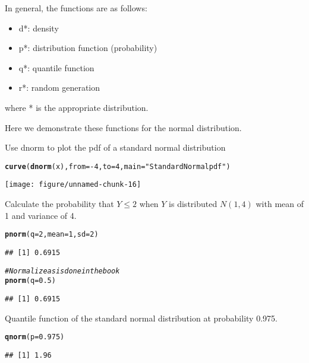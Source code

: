 \documentclass[a4paper]{article}\usepackage[]{graphicx}\usepackage[]{color}
\makeatletter
\def\maxwidth{ %
  \ifdim\Gin@nat@width>\linewidth
    \linewidth
  \else
    \Gin@nat@width
  \fi
}
\newcommand{\hlstr}[1]{\textcolor[rgb]{0.192,0.494,0.8}{#1}}%
\newcommand{\hlcom}[1]{\textcolor[rgb]{0.678,0.584,0.686}{\textit{#1}}}%
\newcommand{\hlkwd}[1]{\textcolor[rgb]{0.737,0.353,0.396}{\textbf{#1}}}%
\newenvironment{kframe}{%
 \def\at@end@of@kframe{}%
 \ifinner\ifhmode%
  \def\at@end@of@kframe{\end{minipage}}%
  \begin{minipage}{\columnwidth}%
 \fi\fi%
 \def\FrameCommand##1{\hskip\@totalleftmargin \hskip-\fboxsep
 \colorbox{shadecolor}{##1}\hskip-\fboxsep
     \hskip-\linewidth \hskip-\@totalleftmargin \hskip\columnwidth}%
 \MakeFramed {\advance\hsize-\width
   \@totalleftmargin\z@ \linewidth\hsize
   \@setminipage}}%
 {\par\unskip\endMakeFramed%
 \at@end@of@kframe}
\newenvironment{knitrout}{}{} %
\makeatother
\begin{document}
In general, the functions are as follows:
\begin{itemize}
\item d*: density
\item p*: distribution function (probability)
\item q*: quantile function
\item r*: random generation
\end{itemize}
where * is the appropriate distribution.

Here we demonstrate these functions for the normal distribution.

Use dnorm to plot the pdf of a standard normal distribution
\begin{knitrout}
\color{fgcolor}\begin{kframe}
\begin{alltt}
\hlkwd{curve}(\hlkwd{dnorm}(x), from = -4, to = 4, main = \hlstr{"Standard Normal pdf"})
\end{alltt}
\end{kframe}
\texttt{[image: figure/unnamed-chunk-16]} 

\end{knitrout}


Calculate the probability that $Y \leq 2$ when $Y$ is distributed $N(1, 4)$ with mean of 1 and variance of 4.
\begin{knitrout}
\color{fgcolor}\begin{kframe}
\begin{alltt}
\hlkwd{pnorm}(q = 2, mean = 1, sd = 2)
\end{alltt}
\begin{verbatim}
## [1] 0.6915
\end{verbatim}
\begin{alltt}
\hlcom{# Normalize as is done in the book}
\hlkwd{pnorm}(q = 0.5)
\end{alltt}
\begin{verbatim}
## [1] 0.6915
\end{verbatim}
\end{kframe}
\end{knitrout}


Quantile function of the standard normal distribution at probability 0.975.
\begin{knitrout}
\color{fgcolor}\begin{kframe}
\begin{alltt}
\hlkwd{qnorm}(p = 0.975)
\end{alltt}
\begin{verbatim}
## [1] 1.96
\end{verbatim}
\end{kframe}
\end{knitrout}
\end{document}
